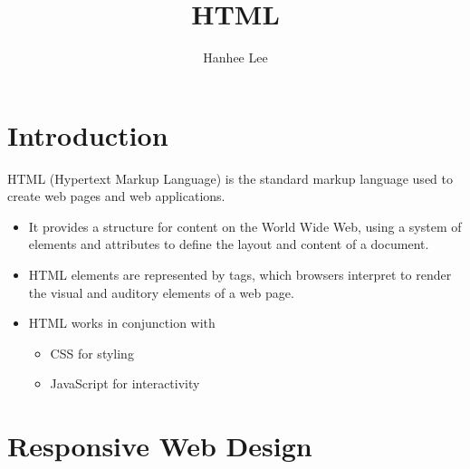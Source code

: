 \documentclass{article}
\title{HTML}
\author{Hanhee Lee}
\begin{document}
\maketitle

\tableofcontents

\section{Introduction}
\begin{definition}
    HTML (Hypertext Markup Language) is the standard markup language used to create web pages and web applications. 
    \begin{itemize}
        \item It provides a structure for content on the World Wide Web, using a system of elements and attributes to define the layout and content of a document. 
        \item HTML elements are represented by tags, which browsers interpret to render the visual and auditory elements of a web page. 
        \item HTML works in conjunction with 
        \begin{itemize}
            \item CSS for styling 
            \item JavaScript for interactivity
        \end{itemize}
    \end{itemize}
\end{definition}
\newpage

\section{Responsive Web Design}

\end{document}
